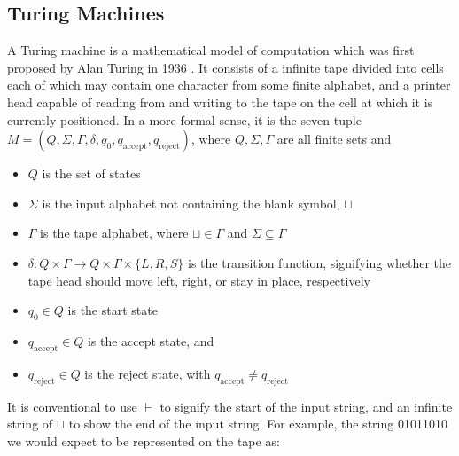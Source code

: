 \documentclass[11pt,a4paper]{article}
\begin{document}
    \subsection{Turing Machines}
    A Turing machine is a mathematical model of computation which was first
    proposed by Alan Turing in 1936 \cite{SipserToC}. It consists of a infinite
    tape divided into cells each of which may contain one character from some
    finite alphabet, and a printer head capable of reading from and writing to the
    tape on the cell at which it is currently positioned. In a more formal
    sense, it is the seven-tuple $M=(Q, \Sigma, \Gamma, \delta, q_0,
    q_{\text{accept}}, q_{\text{reject}})$, where $Q, \Sigma, \Gamma$ are all
    finite sets and

    \begin{itemize}
        \item $Q$ is the set of states
        \item $\Sigma$ is the input alphabet not containing the blank symbol,
            $\sqcup$
        \item $\Gamma$ is the tape alphabet, where $\sqcup \in \Gamma$
            and $\Sigma \subseteq \Gamma$
        \item $\delta: Q \times \Gamma \rightarrow Q \times \Gamma \times
            \{L,R,S\}$ is the transition function, signifying whether the tape
            head should move left, right, or stay in place, respectively
        \item $q_0 \in Q$ is the start state
        \item $q_{\text{accept}} \in Q$ is the accept state, and
        \item $q_{\text{reject}} \in Q$ is the reject state, with
            $q_{\text{accept}} \neq q_{\text{reject}}$
    \end{itemize}

    It is conventional to use $\vdash$ to signify the start of the input string,
    and an infinite string of $\sqcup$ to show the end of the input string. For
    example, the string 01011010 we would expect to be represented on the tape
    as:
    
\end{document}
